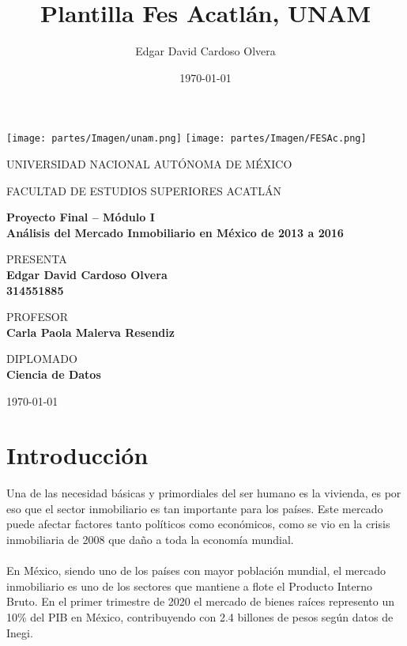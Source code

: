\documentclass{report}
\title{Plantilla Fes Acatlán, UNAM}
\author{Edgar David Cardoso Olvera}
\date{\today}
\begin{document}
	
	\texttt{[image: partes/Imagen/unam.png]}
	\texttt{[image: partes/Imagen/FESAc.png]}
	
	\begin{center}
	\vspace{0.8cm}
	\LARGE
	UNIVERSIDAD NACIONAL AUTÓNOMA DE MÉXICO 
	
	\vspace{0.8cm}
	\LARGE
	FACULTAD DE ESTUDIOS SUPERIORES ACATLÁN
	
	\vspace{1.7cm}	
	\Large
	\textbf{Proyecto Final – Módulo I\\ Análisis del Mercado Inmobiliario en México de 2013 a 2016}
	

	\vspace{1.3cm}
	\normalsize	
	PRESENTA \\
	\vspace{.3cm}
	\large
	\textbf{Edgar David Cardoso Olvera \\ 314551885}
	
	\vspace{1.3cm}
	\normalsize	
	PROFESOR \\
	\vspace{.3cm}
	\large
	\textbf{Carla Paola Malerva Resendiz}
	
	\vspace{1.3cm}
	\normalsize	
	DIPLOMADO \\
	\vspace{.3cm}
	\large
	\textbf{Ciencia de Datos}
	
	\vspace{1.3cm}
	\today
	\end{center}
	

\tableofcontents
\chapter{Introducción}
Una de las necesidad básicas y primordiales del ser humano es la vivienda, es por eso que el sector inmobiliario es tan importante para los países. Este mercado puede afectar factores tanto políticos como económicos, como se vio en la crisis inmobiliaria de 2008 que daño a toda la economía mundial.\\ \\
En México, siendo uno de los países con mayor población mundial, el mercado inmobiliario es uno de los sectores que mantiene a flote el Producto Interno Bruto. En el primer trimestre de 2020 el mercado de bienes raíces represento un 10\% del PIB en México, contribuyendo con 2.4 billones de pesos según datos de Inegi.
\end{document}
